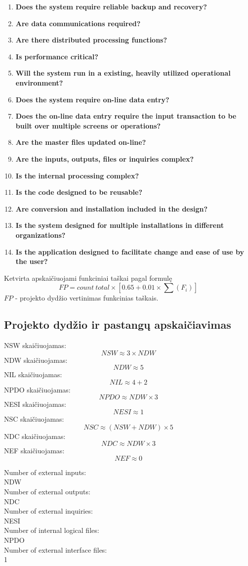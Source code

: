 \documentclass[a4paper,12pt]{article}
\begin{document}
\begin{center}
\begin{enumerate}
\item \textbf{Does the system require reliable backup and recovery?}
\item \textbf{Are data communications required?}
\item \textbf{ Are there distributed processing functions?}
\item \textbf{Is performance critical?}
\item \textbf{Will the system run in a existing, heavily utilized operational environment?}
\item \textbf{Does the system require on-line data entry?}
\item \textbf{Does the on-line data entry require the input transaction to be built over multiple screens or operations?}
\item \textbf{Are the master files updated on-line?}
\item \textbf{Are the inputs, outputs, files or inquiries complex?}
\item \textbf{Is the internal processing complex?}
\item \textbf{Is the code designed to be reusable?}
\item \textbf{Are conversion and installation included in the design?}
\item \textbf{Is the system designed for multiple installations in different organizations?}
\item \textbf{Is the application designed to facilitate change and ease of use by the user?}
\end{enumerate}
Ketvirta apskaičiuojami funkciniai taškai pagal formulę
$$ FP = count\ total \times [0.65 + 0.01 \times \sum(F_i)] $$
$FP$ - projekto dydžio vertinimas funkcinias taškais.

\end{center}

\subsection{Projekto dydžio ir pastangų apskaičiavimas}

NSW skaičiuojamas:
	$$NSW \approx 3 \times NDW$$
NDW skaičiuojamas:
	$$NDW \approx 5 $$
NIL skaičiuojamas:
	$$NIL \approx 4 + 2 $$
NPDO skaičiuojamas:
	$$NPDO \approx NDW\times 3$$
NESI skaičiuojamas:
	$$NESI \approx 1 $$
NSC skaičiuojamas:
	$$NSC \approx (NSW+NDW)\times 5$$
NDC skaičiuojamas:
	$$NDC \approx NDW\times 3$$
NEF skaičiuojamas:
	$$NEF \approx 0$$

Number of external inputs:\\
NDW\\
Number of external outputs:\\
NDC\\
Number of external inquiries:\\
NESI\\
Number of internal logical files:\\
NPDO\\
Number of external interface files:\\
1
\end{document}
